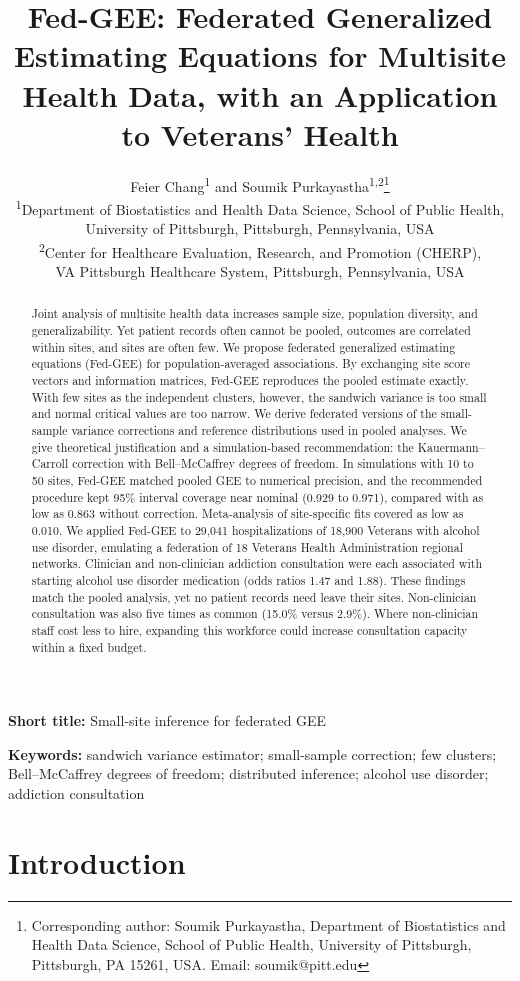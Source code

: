 \documentclass[12pt]{article}
\title{Fed-GEE: Federated Generalized Estimating Equations for Multisite
Health Data, with an Application to Veterans' Health}
\author{Feier Chang\textsuperscript{1} and Soumik Purkayastha\textsuperscript{1,2}\thanks{Corresponding author: Soumik Purkayastha,
Department of Biostatistics and Health Data Science, School of Public Health,
University of Pittsburgh, Pittsburgh, PA 15261, USA. Email: soumik@pitt.edu}\\[6pt]
\small\textsuperscript{1}Department of Biostatistics and Health Data Science, School of Public
Health,\\ \small University of Pittsburgh, Pittsburgh, Pennsylvania, USA\\
\small\textsuperscript{2}Center for Healthcare Evaluation, Research, and Promotion (CHERP),\\
\small VA Pittsburgh Healthcare System, Pittsburgh, Pennsylvania, USA}
\date{}
\theoremstyle{remark}
\begin{document}
\maketitle

\noindent\textbf{Short title:} Small-site inference for federated GEE

\begin{abstract}
Joint analysis of multisite health data increases sample size, population
diversity, and generalizability. Yet patient records often cannot be pooled,
outcomes are correlated within sites, and sites are often few. We propose
federated generalized estimating equations (Fed-GEE) for population-averaged
associations. By exchanging site score vectors and information matrices, Fed-GEE
reproduces the pooled estimate exactly. With few sites as the independent
clusters, however, the sandwich variance is too small and normal critical values
are too narrow. We derive federated versions of the small-sample variance
corrections and reference distributions used in pooled analyses. We give
theoretical justification and a simulation-based recommendation: the
Kauermann--Carroll correction with Bell--McCaffrey degrees of freedom. In
simulations with 10 to 50 sites, Fed-GEE matched pooled GEE to numerical
precision, and the recommended procedure kept 95\% interval coverage near nominal
(0.929 to 0.971), compared with as low as 0.863 without correction.
Meta-analysis of site-specific fits covered as low as 0.010. We applied Fed-GEE
to 29{,}041 hospitalizations of 18{,}900 Veterans with alcohol use disorder,
emulating a federation of 18 Veterans Health Administration regional networks.
Clinician and non-clinician addiction consultation were each associated with
starting alcohol use disorder medication (odds ratios 1.47 and 1.88). These
findings match the pooled analysis, yet no patient records need leave their
sites. Non-clinician consultation was also five times as common (15.0\% versus
2.9\%). Where non-clinician staff cost less to hire, expanding this workforce
could increase consultation capacity within a fixed budget.
\end{abstract}

\noindent\textbf{Keywords:} sandwich variance estimator; small-sample
correction; few clusters; Bell--McCaffrey degrees of freedom; distributed
inference; alcohol use disorder; addiction consultation

\section{Introduction}
\label{sec:introduction}
\end{document}
